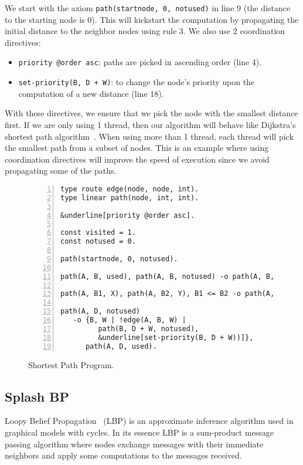 We start with the axiom \texttt{path(startnode, 0, notused)} in line 9 (the distance to the starting node is 0).
This will kickstart the computation by propagating the initial distance to the neighbor nodes using
rule 3. We also use 2 coordination directives:

\begin{itemize}
   \item \texttt{priority @order asc}: paths are picked in ascending order (line 4).
   \item \texttt{set-priority(B, D + W)}: to change the node's priority upon the computation of
a new distance (line 18).
\end{itemize}

With these directives, we ensure that we pick the node with the smallest distance
first. If we are only using 1 thread, then our algorithm will behave like Dijkstra's shortest
path algorithm~\cite{Dijkstra}. When using more than 1 thread, each thread will pick the smallest
path from a subset of nodes. This is an example where using coordination directives will
improve the speed of execution since we avoid propagating some of the paths.

\begin{figure}[h!]
\small\begin{Verbatim}[numbers=left,commandchars=&\[\]]
type route edge(node, node, int).
type linear path(node, int, int).

&underline[priority @order asc].

const visited = 1.
const notused = 0.

path(startnode, 0, notused).

path(A, B, used), path(A, B, notused) -o path(A, B, used).

path(A, B1, X), path(A, B2, Y), B1 <= B2 -o path(A, B1, X).

path(A, D, notused)
   -o {B, W | !edge(A, B, W) |
         path(B, D + W, notused),
         &underline[set-priority(B, D + W))]},
      path(A, D, used).
\end{Verbatim}
  \caption{Shortest Path Program.}
  \label{code:shortest_path_program}
\end{figure}
\normalsize
\subsection{Splash BP}

Loopy Belief Propagation~\cite{Murphy99loopybelief} (LBP) is an approximate inference algorithm
used in graphical models with cycles. In its essence LBP is a sum-product message passing algorithm
where nodes exchange messages with their immediate neighbors and apply some computations to the messages
received.

